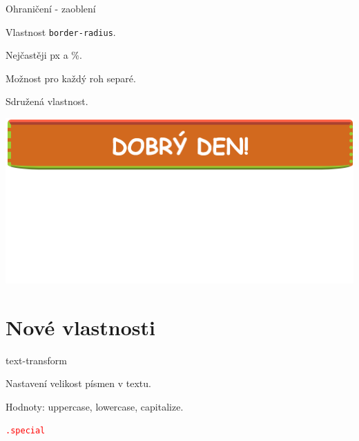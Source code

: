 \documentclass[aspectratio=1610]{beamer}
\begin{document}
\begin{frame}{Ohraničení - zaoblení}
    \begin{cardTiny}
        \begin{flushleft}
            Vlastnost \texttt{border-radius}.

            \vspace{2ex}

            Nejčastěji px a \%.

            Možnost pro každý roh separé.

            Sdružená vlastnost.
        \end{flushleft}
    \end{cardTiny}
\end{frame}

\begin{frame}
    \begin{center}
        \includegraphics[width=\textwidth]{img/9-10-ukol-odsazeni.png}
    \end{center}
\end{frame}

\section{Nové vlastnosti}

\begin{frame}{text-transform}
    \begin{cardTiny}
        Nastavení velikost písmen v textu.

        Hodnoty: uppercase, lowercase, capitalize.

        \begin{alltt}
            \textcolor{red}{.special} \string{\\
                \textcolor{blue}{text-transform}: \textcolor{orange}{uppercase};\\
            \string}
        \end{alltt}
    \end{cardTiny}
\end{frame}
\end{document}
